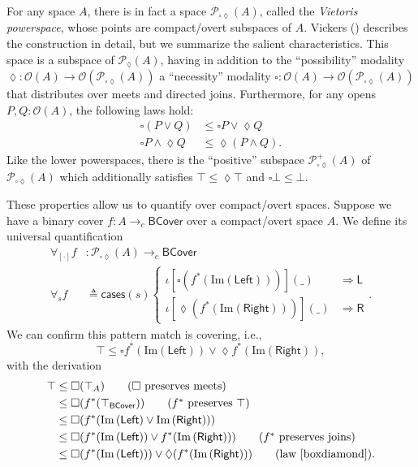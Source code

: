 \documentclass[conference]{IEEEtran}
\newcommand{\PLower}{\mathcal{P}_\lozenge}
\newcommand{\Viet}{\mathcal{P}_{\square\lozenge}}
\newcommand{\cto}{\to_c}
\newcommand{\Open}[1]{\mathcal{O}({#1})}
\newcommand{\wildcard}{\_}
\newcommand{\Img}[1]{\text{Im}\left({#1}\right)}
\newcommand{\oinclf}[1]{\iota[{#1}]}
\newcommand{\oincl}[2]{\oinclf{#1} \left({#2}\right)}
\newcommand{\Branch}{\Rightarrow}
\newcommand{\BCover}{\mathsf{BCover}}
\newcommand{\iimg}[1]{{#1}^*}
\begin{document}
For any space $A$, there is in fact a space $\Viet(A)$, called the \emph{Vietoris powerspace}, whose points are compact/overt subspaces of $A$. Vickers (\cite{vickersconnected, vickersdoublepowerlocale}) describes the construction in detail, but we summarize the salient characteristics. This space is a subspace of $\PLower(A)$, having in addition to the ``possibility'' modality $\lozenge : \Open{A} \to \Open{\Viet(A)}$ a ``necessity'' modality $\square : \Open{A} \to \Open{\Viet(A)}$ that distributes over meets and directed joins. Furthermore, for any opens $P, Q : \Open{A}$, the following laws hold:
\begin{align}
\label{boxdiamond}
\square (P \vee Q) &\le \square P \vee \lozenge Q
\\  \square P \wedge \lozenge Q &\le \lozenge (P \wedge Q).
\end{align}
Like the lower powerspaces, there is the ``positive'' subspace $\Viet^+(A)$ of $\Viet(A)$ which additionally satisfies $\top \le \lozenge \top$ and $\square \bot \le \bot$.

These properties allow us to quantify over compact/overt spaces. Suppose we have a binary cover $f : A \cto \BCover$ over a compact/overt space $A$. We define its universal quantification
\begin{align*}
\forall_{[\cdot]} f &: \Viet(A) \cto \BCover
\\ \forall_s f &\triangleq \mathsf{cases}(s)
\begin{cases}
\oincl{\square \left( \iimg{f}(\Img{\mathsf{Left}}) \right) }{\wildcard} &\Branch \mathsf{L}
\\ \oincl{\lozenge \left( \iimg{f}(\Img{\mathsf{Right}}) \right)}{\wildcard} &\Branch \mathsf{R}
\end{cases}.
\end{align*}
We can confirm this pattern match is covering, i.e.,
\[
\top \le \square \iimg{f}(\Img{\mathsf{Left}}) \vee \lozenge \iimg{f}(\Img{\mathsf{Right}}),
\]
with the derivation
\begin{align*}
\top 
  &\le \square (\top_A) \tag{$\square$ preserves meets}
\\ &\le \square (\iimg{f}(\top_\BCover)) \tag{$\iimg{f}$ preserves $\top$}
\\ &\le \square (\iimg{f}(\Img{\mathsf{Left}} \vee \Img{\mathsf{Right}}))
\\ &\le \square(\iimg{f}(\Img{\mathsf{Left}}) \vee \iimg{f}(\Img{\mathsf{Right}}))  \tag{$\iimg{f}$ preserves joins}
\\ &\le \square (\iimg{f}(\Img{\mathsf{Left}})) \vee \lozenge (\iimg{f}(\Img{\mathsf{Right}})) \tag{law \ref{boxdiamond}}.
\end{align*}
\end{document}
